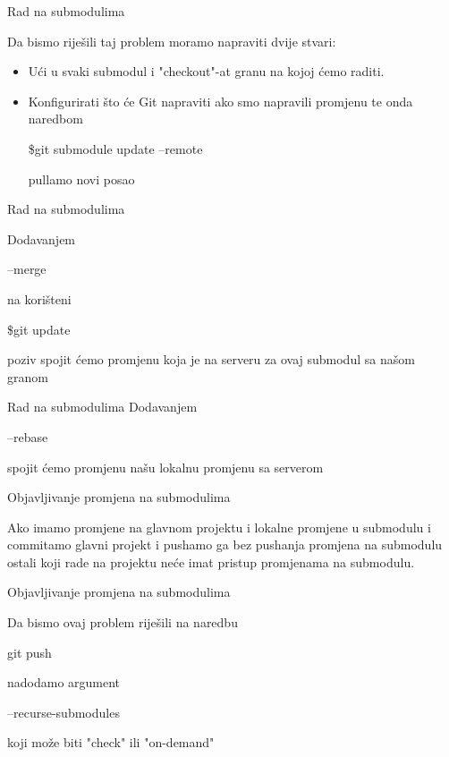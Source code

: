 \documentclass[10pt]{beamer}
\begin{document}
\begin{frame}[fragile]{Rad na submodulima}
    
    Da bismo riješili taj problem moramo napraviti dvije stvari:
    \begin{itemize}
    \item Ući u svaki submodul i "checkout"-at granu na kojoj ćemo raditi.
    \item Konfigurirati što će Git napraviti ako smo napravili promjenu te onda naredbom
     \begin{semiverbatim}\$git submodule update --remote \end{semiverbatim}
    pullamo novi posao
    \end{itemize}
\end{frame}

\begin{frame}[fragile]{Rad na submodulima}
    
    Dodavanjem \begin{semiverbatim}--merge\end{semiverbatim} na korišteni \begin{semiverbatim}\$git update\end{semiverbatim} poziv spojit ćemo promjenu koja je na serveru za ovaj submodul sa našom granom
    
\end{frame}

\begin{frame}[fragile]{Rad na submodulima}
    Dodavanjem
    \begin{semiverbatim}--rebase\end{semiverbatim}
    spojit ćemo promjenu našu lokalnu promjenu sa serverom
\end{frame}

\begin{frame}[fragile]{Objavljivanje promjena na submodulima}
    
    Ako imamo promjene na glavnom projektu i lokalne promjene u submodulu i commitamo glavni projekt i pushamo ga bez pushanja promjena na submodulu ostali koji rade na projektu neće imat pristup promjenama na submodulu. 
    
\end{frame}


\begin{frame}[fragile]{Objavljivanje promjena na submodulima}
    
    Da bismo ovaj problem riješili na naredbu
    \begin{semiverbatim}git push\end{semiverbatim}
    nadodamo argument \begin{semiverbatim}--recurse-submodules\end{semiverbatim}
    koji može biti "check" ili "on-demand"
\end{frame}
\end{document}
